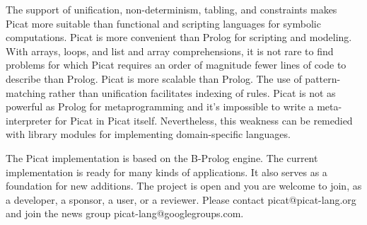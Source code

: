 The support of unification, non-determinism, tabling, and constraints makes Picat more suitable than functional and scripting languages for symbolic computations. Picat is more convenient than Prolog for scripting and modeling. With arrays, loops, and list and array comprehensions, it is not rare to find problems for which Picat requires an order of magnitude fewer lines of code to describe than Prolog. Picat is more scalable than Prolog. The use of pattern-matching rather than unification facilitates indexing of rules. Picat is not as powerful as Prolog for metaprogramming and it's impossible to write a meta-interpreter for Picat in Picat itself. Nevertheless, this weakness can be remedied with library modules for implementing domain-specific languages.

The Picat implementation is based on the B-Prolog engine. The current implementation is ready for many kinds of applications. It also serves as a foundation for new additions. The project is open and you are welcome to join, as a developer, a sponsor, a user, or a reviewer. Please contact picat@picat-lang.org and join the news group picat-lang@googlegroups.com.


